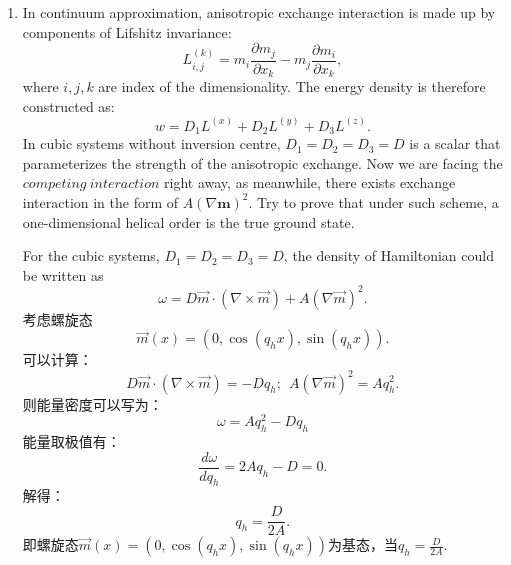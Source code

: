 \documentclass[reqno,a4paper,12pt]{amsart}
\begin{document}
\begin{enumerate}[1]
\begin{tcolorbox}[colback = black!5!white, colframe = black, breakable]

\end{tcolorbox}


\item In continuum approximation, anisotropic exchange interaction is made up by components of Lifshitz invariance: 
\begin{equation}
	L_{i, j}^{(k)} = m_i\frac{\partial m_j}{\partial x_k} - m_j\frac{\partial m_i}{\partial x_k},
\end{equation}
where $i,j,k$ are index of the dimensionality. The energy density is therefore constructed as:
\begin{equation}
	w = D_1 L^{(x)} + D_2 L^{(y)} + D_3 L^{(z)}.
\end{equation}
In cubic systems without inversion centre, $D_1 = D_2 = D_3 = D$ is a scalar that parameterizes the strength of the anisotropic exchange. Now we are facing the $competing ~ interaction$ right away, as meanwhile, there exists exchange interaction in the form of $A(\nabla \textbf{m})^2$. Try to prove that under such scheme, a one-dimensional helical order is the true ground state.

\begin{tcolorbox}[colback = black!5!white, colframe = black, breakable]
For the cubic systems, $D_1 = D_2 = D_3 = D$, the density of Hamiltonian could be written as
\[
	\omega = D\vec{m} \cdot (\nabla \times \vec{m}) + A(\nabla \vec{m})^2.
\]
考虑螺旋态
\[
	\vec{m}(x) = (0, \cos(q_h x), \sin(q_hx)).
\]
可以计算：
\[
	D\vec{m}\cdot (\nabla\times\vec{m}) = -Dq_h; ~~ A(\nabla \vec{m})^2 = Aq_h^2.
\]
则能量密度可以写为：
\[
	\omega = Aq_h^2 - Dq_h
\]
能量取极值有：
\[
	\frac{d\omega}{dq_h} = 2Aq_h-D = 0.
\]
解得：
\[
	q_h = \frac{D}{2A}.
\]
即螺旋态$\vec{m}(x) = (0,\cos(q_hx),\sin(q_hx))$为基态，当$q_h = \frac{D}{2A}$.
\end{tcolorbox}



\end{enumerate}
\end{document}
